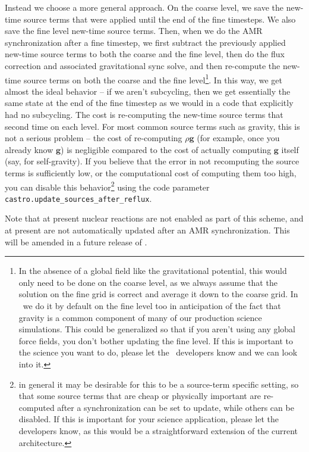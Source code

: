 Instead we choose a more general approach. On the coarse level, we save
the new-time source terms that were applied until the end of the fine
timesteps. We also save the fine level new-time source terms. Then, when
we do the AMR synchronization after a fine timestep, we first subtract
the previously applied new-time source terms to both the coarse and the
fine level, then do the flux correction and associated gravitational
sync solve, and then re-compute the new-time source terms on both the
coarse and the fine level\footnote{In the absence of a global field like
the gravitational potential, this would only need to be done on the
coarse level, as we always assume that the solution on the fine grid is
correct and average it down to the coarse grid. In \castro\ we do it by
default on the fine level too in anticipation of the fact that gravity
is a common component of many of our production science
simulations. This could be generalized so that if you aren't using any
global force fields, you don't bother updating the fine level. If this
is important to the science you want to do, please let the \castro\
developers know and we can look into it.}.  In this way, we get almost
the ideal behavior -- if we aren't subcycling, then we get essentially
the same state at the end of the fine timestep as we would in a code
that explicitly had no subcycling. The cost is re-computing the new-time
source terms that second time on each level. For most common source
terms such as gravity, this is not a serious problem -- the cost of
re-computing $\rho \mathbf{g}$ (for example, once you already know
$\mathbf{g}$) is negligible compared to the cost of actually computing
$\mathbf{g}$ itself (say, for self-gravity).  If you believe that the
error in not recomputing the source terms is sufficiently low, or the
computational cost of computing them too high, you can disable this
behavior\footnote{in general it may be desirable for this to be a
source-term specific setting, so that some source terms that are cheap
or physically important are re-computed after a synchronization can be
set to update, while others can be disabled. If this is important for
your science application, please let the developers know, as this would
be a straightforward extension of the current architecture.} using the
code parameter {\tt castro.update\_sources\_after\_reflux}.

Note that at present nuclear reactions are not enabled as part of this
scheme, and at present are not automatically updated after an AMR
synchronization. This will be amended in a future release of \castro.

